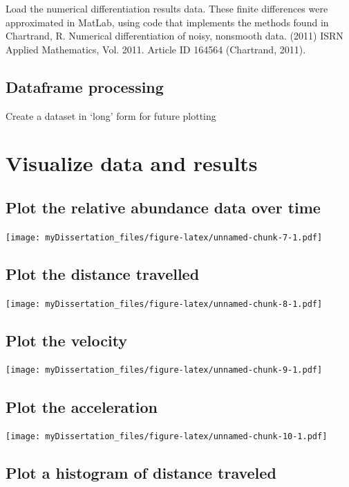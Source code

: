 \documentclass[12pt,twoside]{reedthesis}
\begin{document}
Load the numerical differentiation results data. These finite
differences were approximated in MatLab, using code that implements the
methods found in Chartrand, R. Numerical differentiation of noisy,
nonsmooth data. (2011) ISRN Applied Mathematics, Vol. 2011. Article ID
164564 (Chartrand, 2011).

\subsection{Dataframe processing}\label{dataframe-processing}

Create a dataset in `long' form for future plotting

\section{Visualize data and results}\label{visualize-data-and-results}

\subsection{Plot the relative abundance data over
time}\label{plot-the-relative-abundance-data-over-time}

\texttt{[image: myDissertation\_files/figure-latex/unnamed-chunk-7-1.pdf]}

\subsection{Plot the distance
travelled}\label{plot-the-distance-travelled}

\texttt{[image: myDissertation\_files/figure-latex/unnamed-chunk-8-1.pdf]}

\subsection{Plot the velocity}\label{plot-the-velocity}

\texttt{[image: myDissertation\_files/figure-latex/unnamed-chunk-9-1.pdf]}

\subsection{Plot the acceleration}\label{plot-the-acceleration}

\texttt{[image: myDissertation\_files/figure-latex/unnamed-chunk-10-1.pdf]}

\subsection{Plot a histogram of distance
traveled}\label{plot-a-histogram-of-distance-traveled}
\end{document}
